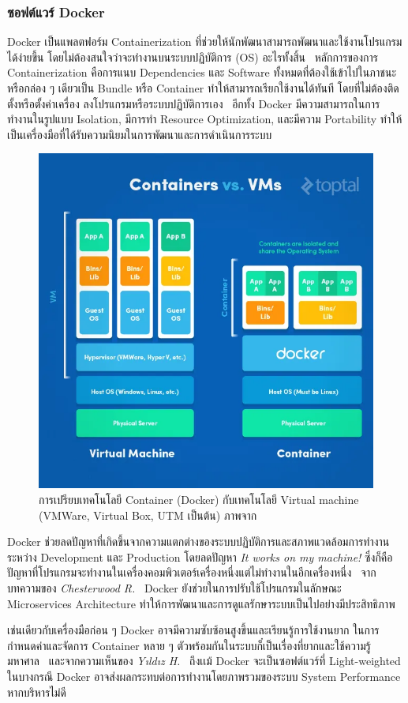 \documentclass[12pt,one side,openright,a4paper]{cpe-thesis-th}
\newcommand{\thaijustify}[1]{%
  \par\hspace{30pt}\justifying
  #1
}
\begin{document}
\subsubsection{ซอฟต์แวร์ Docker}
\thaijustify{
  Docker เป็นแพลตฟอร์ม Containerization ที่ช่วยให้นักพัฒนาสามารถพัฒนาและใช้งานโปรแกรมได้ง่ายขึ้น โดยไม่ต้องสนใจว่าจะทำงานบนระบบปฏิบัติการ (OS) อะไรทั้งสิ้น~\cite{docker} หลักการของการ Containerization คือการแนบ Dependencies และ Software ทั้งหมดที่ต้องใช้เข้าไปในภาชนะหรือกล่อง ๆ เดียวเป็น Bundle หรือ Container ทำให้สามารถเรียกใช้งานได้ทันที โดยที่ไม่ต้องติดตั้งหรือตั้งค่าเครื่อง ลงโปรแกรมหรือระบบปฏิบัติการเอง~\cite{docker, yıldız23docker} อีกทั้ง Docker มีความสามารถในการทำงานในรูปแบบ Isolation, มีการทำ Resource Optimization, และมีความ Portability ทำให้เป็นเครื่องมือที่ได้รับความนิยมในการพัฒนาและการดำเนินการระบบ~\cite{yıldız23docker}
}
\begin{figure}[H]
  \centering
  \includegraphics[width=12cm]{figure/literature/docker-compare.png}
  \caption[ภาพเปรียบเทียบเทคโนโลยี Docker กับ Virtual Machine]{การเปรียบเทคโนโลยี Container (Docker) กับเทคโนโลยี Virtual machine (VMWare, Virtual Box, UTM เป็นต้น) ภาพจาก~\cite{dockerdummies}}\label{fig:lit-docker}
\end{figure}
\thaijustify{
  Docker ช่วยลดปัญหาที่เกิดขึ้นจากความแตกต่างของระบบปฏิบัติการและสภาพแวดล้อมการทำงานระหว่าง Development และ Production โดยลดปัญหา \textit{It works on my machine!} ซึ่งก็คือปัญหาที่โปรแกรมจะทำงานในเครื่องคอมพิวเตอร์เครื่องหนึ่งแต่ไม่ทำงานในอีกเครื่องหนึ่ง~\cite{yıldız23docker} จากบทความของ \textit{Chesterwood R.}~\cite{chesterwood21microservice} Docker ยังช่วยในการปรับใช้โปรแกรมในลักษณะ Microservices Architecture ทำให้การพัฒนาและการดูแลรักษาระบบเป็นไปอย่างมีประสิทธิภาพ
}
\thaijustify{
  เช่นเดียวกับเครื่องมือก่อน ๆ Docker อาจมีความซับซ้อนสูงขึ้นและเรียนรู้การใช้งานยาก ในการกำหนดค่าและจัดการ Container หลาย ๆ ตัวพร้อมกันในระบบก็๋เป็นเรื่องที่ยากและใช้ความรู้มหาศาล~\cite{dockerdoc} และจากความเห็นของ \textit{Yıldız H.}~\cite{yıldız23docker} ถึงเเม้ Docker จะเป็นซอฟต์แวร์ที่ Light-weighted ในบางกรณี Docker อาจส่งผลกระทบต่อการทำงานโดยภาพรวมของระบบ System Performance หากบริหารไม่ดี
}
\end{document}
